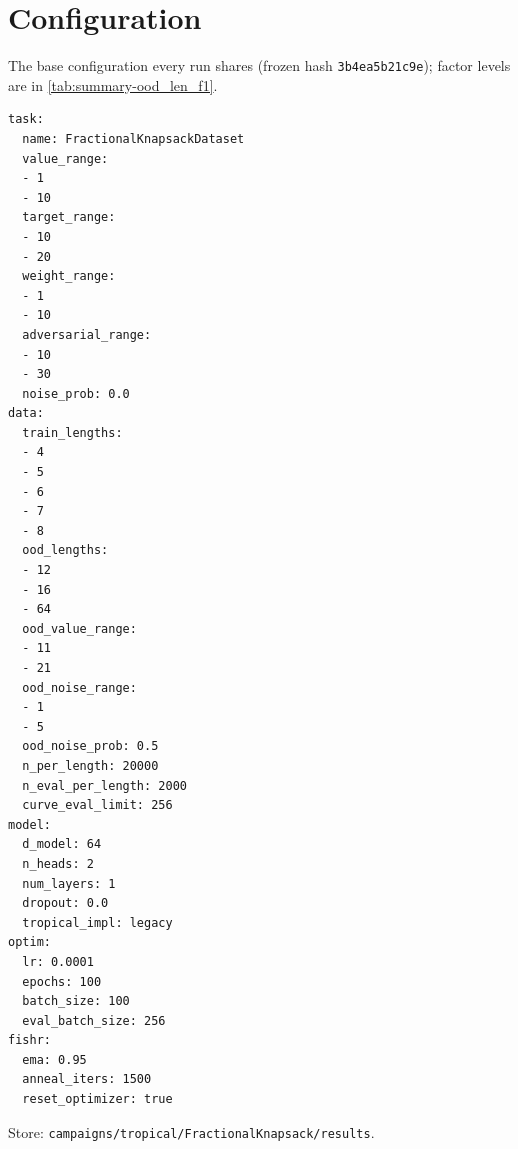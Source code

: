 \documentclass[10pt]{article}
\begin{document}
\section{Configuration}
The base configuration every run shares (frozen hash \texttt{3b4ea5b21c9e}); factor levels are in \autoref{tab:summary-ood_len_f1}.
{\footnotesize
\begin{verbatim}
task:
  name: FractionalKnapsackDataset
  value_range:
  - 1
  - 10
  target_range:
  - 10
  - 20
  weight_range:
  - 1
  - 10
  adversarial_range:
  - 10
  - 30
  noise_prob: 0.0
data:
  train_lengths:
  - 4
  - 5
  - 6
  - 7
  - 8
  ood_lengths:
  - 12
  - 16
  - 64
  ood_value_range:
  - 11
  - 21
  ood_noise_range:
  - 1
  - 5
  ood_noise_prob: 0.5
  n_per_length: 20000
  n_eval_per_length: 2000
  curve_eval_limit: 256
model:
  d_model: 64
  n_heads: 2
  num_layers: 1
  dropout: 0.0
  tropical_impl: legacy
optim:
  lr: 0.0001
  epochs: 100
  batch_size: 100
  eval_batch_size: 256
fishr:
  ema: 0.95
  anneal_iters: 1500
  reset_optimizer: true
\end{verbatim}
}
Store: \texttt{campaigns/tropical/FractionalKnapsack/results}.
\end{document}
